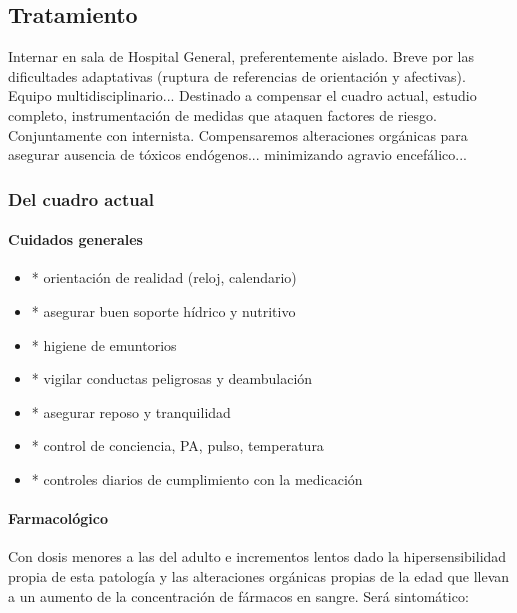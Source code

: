 \subsection*{Tratamiento}

Internar en sala de Hospital General, preferentemente aislado. Breve por las dificultades adaptativas (ruptura de referencias de orientación y afectivas). Equipo multidisciplinario... Destinado a compensar el cuadro actual, estudio completo, instrumentación de medidas que ataquen factores de riesgo. Conjuntamente con internista. Compensaremos alteraciones orgánicas para asegurar ausencia de tóxicos endógenos... minimizando agravio encefálico...

\subsubsection{Del cuadro actual}
\paragraph{Cuidados generales}
\begin{itemize}
	\item * orientación de realidad (reloj, calendario)
	\item * asegurar buen soporte hídrico y nutritivo
	\item * higiene de emuntorios
	\item * vigilar conductas peligrosas y deambulación
	\item * asegurar reposo y tranquilidad
	\item * control de conciencia, PA, pulso, temperatura
	\item * controles diarios de cumplimiento con la medicación
\end{itemize}
\paragraph{Farmacológico}
Con dosis menores a las del adulto e incrementos lentos dado la hipersensibilidad propia de esta patología y las alteraciones orgánicas propias de la edad que llevan a un aumento de la concentración de fármacos en sangre. Será sintomático:

